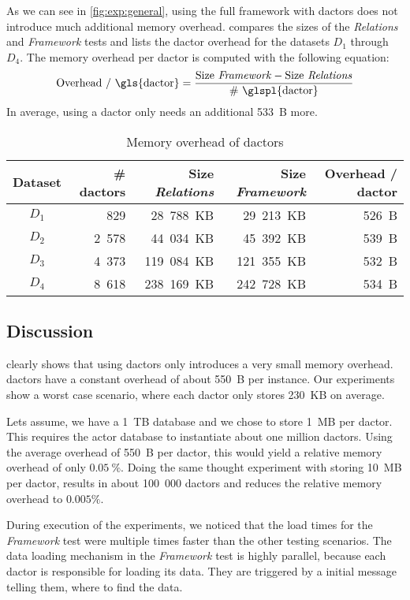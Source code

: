   As we can see in \cref{fig:exp:general}, using the full framework with \glspl{dactor} does not introduce much additional memory overhead.
   compares the sizes of the \textit{Relations} and \textit{Framework} tests and lists the \gls{dactor} overhead for the datasets $D_1$ through $D_4$.
  The memory overhead per \gls{dactor} is computed with the following equation:
  \begin{equation}
    \text{Overhead / \gls{dactor}} = \frac{\text{Size \textit{Framework}} - \text{Size \textit{Relations}}}{\text{\# \glspl{dactor}}}
  \end{equation}
  In average, using a \gls{dactor} only needs an additional 533~B more.

  \begin{table}
    \centering
    \begin{tabular}{crrrr}
      \toprule
      \textbf{Dataset} & \textbf{\# \Glspl{dactor}} & \textbf{Size \textit{Relations}} & \textbf{Size \textit{Framework}} & \textbf{Overhead / \gls{dactor}}\\
      \midrule
      $D_1$ & 829 & 28~788~KB & 29~213~KB & 526~B \\
      $D_2$ & 2~578 & 44~034~KB & 45~392~KB & 539~B \\
      $D_3$ & 4~373 & 119~084~KB & 121~355~KB & 532~B \\
      $D_4$ & 8~618 & 238~169~KB & 242~728~KB & 534~B \\
      \bottomrule
    \end{tabular}
    \caption{Memory overhead of \glspl{dactor}}
    \label{tab:memory_overhead}
  \end{table}


\subsection{Discussion}\label{sec:exp:discussion}

   clearly shows that using \glspl{dactor} only introduces a very small memory overhead.
  \Glspl{dactor} have a constant overhead of about 550~B per instance.
  Our experiments show a worst case scenario, where each \gls{dactor} only stores 230~KB on average.
  
  Lets assume, we have a 1~TB database and we chose to store 1~MB per \gls{dactor}.
  This requires the actor database to instantiate about one million \glspl{dactor}.
  Using the average overhead of 550~B per \gls{dactor}, this would yield a relative memory overhead of only $0.05~\%$.
  Doing the same thought experiment with storing 10~MB per \gls{dactor}, results in about 100~000 \glspl{dactor} and reduces the relative memory overhead to $0.005 \%$.

  During execution of the experiments, we noticed that the load times for the \textit{Framework} test were multiple times faster than the other testing scenarios.
  The data loading mechanism in the \textit{Framework} test is highly parallel, because each \gls{dactor} is responsible for loading its data.
  They are triggered by a initial message telling them, where to find the data.
